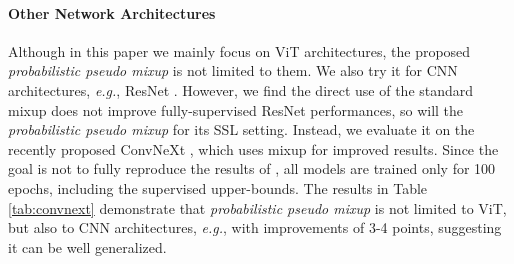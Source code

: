 \documentclass{article}
\newcommand\eg{\emph{e.g.}}
\begin{document}
\paragraph{Other Network Architectures}
Although in this paper we mainly focus on ViT architectures, the proposed \emph{probabilistic pseudo mixup} is not limited to them. We also try it for CNN architectures, \eg, ResNet \cite{DBLP:conf/cvpr/HeZRS16}. However, we find the direct use of the standard mixup does not improve fully-supervised ResNet performances, so will the \emph{probabilistic pseudo mixup} for its SSL setting. Instead, we evaluate it on the recently proposed ConvNeXt \cite{liu2022convnet}, which uses mixup for improved results. Since the goal is not to fully reproduce the results of \cite{liu2022convnet}, all models are trained only for 100 epochs, including the supervised upper-bounds. The results in Table \ref{tab:convnext} demonstrate that \emph{probabilistic pseudo mixup} is not limited to ViT, but also to CNN architectures, \eg, with improvements of 3-4 points, suggesting it can be well generalized.
\end{document}

